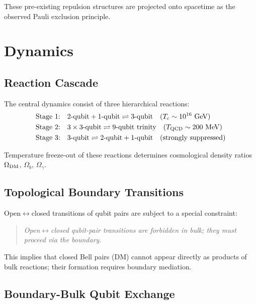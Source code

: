 \documentclass[11pt,a4paper]{article}
\begin{document}
These pre-existing repulsion structures are projected onto spacetime as the observed Pauli exclusion principle.

\section{Dynamics}
\label{sec:dynamics}

\subsection{Reaction Cascade}

The central dynamics consist of three hierarchical reactions:
\begin{align}
\text{Stage 1:} \quad & 2\text{-qubit} + 1\text{-qubit} \rightleftharpoons 3\text{-qubit} \quad (T_c \sim 10^{16}~\text{GeV}) \\
\text{Stage 2:} \quad & 3 \times 3\text{-qubit} \rightleftharpoons 9\text{-qubit trinity} \quad (T_{\rm QCD} \sim 200~\text{MeV}) \\
\text{Stage 3:} \quad & 3\text{-qubit} \rightleftharpoons 2\text{-qubit} + 1\text{-qubit} \quad \text{(strongly suppressed)}
\end{align}

Temperature freeze-out of these reactions determines cosmological density ratios $\Omega_{\rm DM}$, $\Omega_b$, $\Omega_\gamma$.

\subsection{Topological Boundary Transitions}

Open$\leftrightarrow$closed transitions of qubit pairs are subject to a special constraint:
\begin{quote}
\textit{Open$\leftrightarrow$closed qubit-pair transitions are forbidden in bulk; they must proceed via the boundary.}
\end{quote}

This implies that closed Bell pairs (DM) cannot appear directly as products of bulk reactions; their formation requires boundary mediation.

\subsection{Boundary-Bulk Qubit Exchange}
\end{document}
